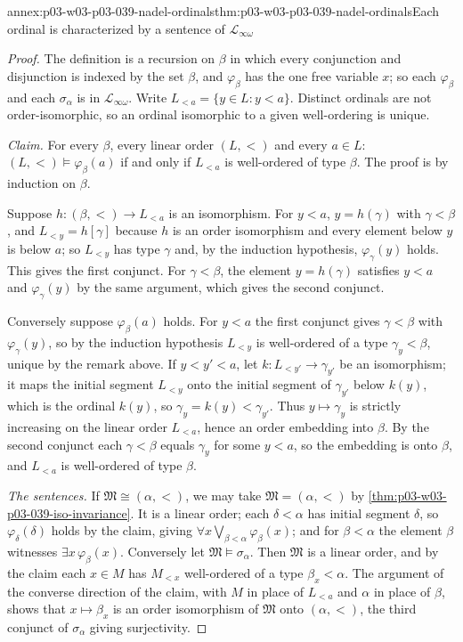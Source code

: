\begin{annexitem}{annex:p03-w03-p03-039-nadel-ordinals}{thm:p03-w03-p03-039-nadel-ordinals}{Each ordinal is characterized by a sentence of \(\mathscr L_{\infty\omega}\)}
\begin{proof}
The definition is a recursion on \(\beta\) in which every conjunction and
disjunction is indexed by the set \(\beta\), and \(\varphi_\beta\) has the one
free variable \(x\); so each \(\varphi_\beta\) and each \(\sigma_\alpha\) is in
\(\mathscr L_{\infty\omega}\). Write \(L_{<a}=\{y\in L:y<a\}\). Distinct
ordinals are not order-isomorphic, so an ordinal isomorphic to a given
well-ordering is unique.

\emph{Claim.} For every \(\beta\), every linear order \((L,<)\) and every
\(a\in L\): \((L,<)\models\varphi_\beta(a)\) if and only if \(L_{<a}\) is
well-ordered of type \(\beta\). The proof is by induction on \(\beta\).

Suppose \(h:(\beta,<)\to L_{<a}\) is an isomorphism. For \(y<a\), \(y=h(\gamma)\)
with \(\gamma<\beta\), and \(L_{<y}=h[\gamma]\) because \(h\) is an order
isomorphism and every element below \(y\) is below \(a\); so \(L_{<y}\) has
type \(\gamma\) and, by the induction hypothesis, \(\varphi_\gamma(y)\)
holds. This gives the first conjunct. For \(\gamma<\beta\), the element
\(y=h(\gamma)\) satisfies \(y<a\) and \(\varphi_\gamma(y)\) by the same
argument, which gives the second conjunct.

Conversely suppose \(\varphi_\beta(a)\) holds. For \(y<a\) the first conjunct
gives \(\gamma<\beta\) with \(\varphi_\gamma(y)\), so by the induction
hypothesis \(L_{<y}\) is well-ordered of a type \(\gamma_y<\beta\), unique by
the remark above. If \(y<y'<a\), let \(k:L_{<y'}\to\gamma_{y'}\) be an
isomorphism; it maps the initial segment \(L_{<y}\) onto the initial segment
of \(\gamma_{y'}\) below \(k(y)\), which is the ordinal \(k(y)\), so
\(\gamma_y=k(y)<\gamma_{y'}\). Thus \(y\mapsto\gamma_y\) is strictly
increasing on the linear order \(L_{<a}\), hence an order embedding into
\(\beta\). By the second conjunct each \(\gamma<\beta\) equals \(\gamma_y\)
for some \(y<a\), so the embedding is onto \(\beta\), and \(L_{<a}\) is
well-ordered of type \(\beta\).

\emph{The sentences.} If \(\mathfrak M\cong(\alpha,<)\), we may take
\(\mathfrak M=(\alpha,<)\) by \cref{thm:p03-w03-p03-039-iso-invariance}. It is a
linear order; each \(\delta<\alpha\) has initial segment \(\delta\), so
\(\varphi_\delta(\delta)\) holds by the claim, giving
\(\forall x\bigvee_{\beta<\alpha}\varphi_\beta(x)\); and for \(\beta<\alpha\)
the element \(\beta\) witnesses \(\exists x\,\varphi_\beta(x)\). Conversely
let \(\mathfrak M\models\sigma_\alpha\). Then \(\mathfrak M\) is a linear
order, and by the claim each \(x\in M\) has \(M_{<x}\) well-ordered of a type
\(\beta_x<\alpha\). The argument of the converse direction of the claim,
with \(M\) in place of \(L_{<a}\) and \(\alpha\) in place of \(\beta\), shows
that \(x\mapsto\beta_x\) is an order isomorphism of \(\mathfrak M\) onto
\((\alpha,<)\), the third conjunct of \(\sigma_\alpha\) giving surjectivity.
\end{proof}
\end{annexitem}

